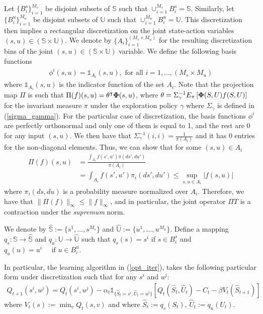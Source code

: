 \documentclass[11pt]{article}
\begin{document}
Let $\{B^s_i\}_{i=1}^{M_s}$ be disjoint subsets of $\mathds{S}$ such that $\cup_{i=1}^{M_s}B^s_i=\mathds{S}$. Similarly, let $\{B^u_i\}_{i=1}^{M_u}$ be disjoint subsets of $\mathds{U}$ such that $\cup_{i=1}^{M_u}B^u_i=\mathds{U}$.   This discretization then implies a rectangular discretization on the joint state-action variables $(s,u)\in(\mathds{S\times U})$.
We denote by $\{A_i\}_{i=1}^{(M_s\times M_u)}$ for the resulting discretization bins of the joint $(s,u)\in(\mathds{S\times U})$ variable.
We define the following basis functions 
\begin{align*}
\phi^i(s,u)=\mathds{1}_{A_i}(s,u), \text{ for all } i=1,\dots, (M_s\times M_u)
\end{align*}
where $\mathds{1}_{A_i}(s,u)$ is the indicator function of the set $A_i$. Note that the projection map $\Pi$ is such that $\Pi(f)(s,u)=\theta^\intercal {\bf \Phi}(s,u)$, where $\theta=\Sigma^{-1}_\gamma E_{\pi}\left[ {\bf \Phi}(S,U)f(S,U)\right]$
for the invariant measure $\pi$ under the exploration policy $\gamma$ where $\Sigma_\gamma$ is defined in (\ref{sigma_gamma}). For the particular case of discretization, the basis functions $\phi^i$ are perfectly orthonormal and only one of them is equal to 1, and the rest are 0 for any input $(s,u)$. We then have that $
\Sigma^{-1}_\gamma(i,i)=\frac{1}{\pi(A_i)}
$
and it has $0$ entries for the non-diagonal elements. Thus, we can show that for some $(s,u)\in A_i$ 
\begin{align*}
\Pi(f)(s,u) &= \frac{\int_{A_i} f(s',u')\pi(ds',du')}{\pi(A_i)}\\
&=\int_{A_i} f(s',u')\pi_i(ds',du')\leq \sup_{s,u\in A_i} |f(s,u)|
\end{align*}
where $\pi_i(ds,du)$ is a probability measure normalized over $A_i$. Therefore, we have that $\|\Pi(f)\|_\infty\leq \|f\|_\infty$, and in particular,  the joint operator $\Pi T$ is a contraction under the \emph{supremum} norm. 


 We denote by $\hat{\mathds{S}}:=\{s^1,\dots,s^{M_s}\}$ and $\hat{\mathds{U}}:=\{u^1,\dots,u^{M_u}\}$.
 Define a mapping $q_s:\mathds{S}\to\mathds{\hat{S}}$ and  $q_u:\mathds{U}\to\mathds{\hat{U}}$  such that 
$q_s(s)=s^i$  if  $s\in B^s_i$ and $q_u(u)=u^i \quad \text{ if } u\in B^u_i.$  %

 In particular, the learning algorithm in (\ref{opt_iter}), takes the following particular form under discretization such that for any $s^i $ and $u^j$:
\begin{align*}
Q_{t+1}(s^i,u^j) = Q_t(s^i,u^j) - \alpha_t \mathds{1}_{\{\hat{S}_t=s^i, \hat{U}_t = u^j\}}\left[ Q_t(\hat{S}_t,\hat{U}_t) - C_t - \beta V_t(\hat{S}_{t+1}) \right]
\end{align*}
where $V_t(s):=\min_v Q_t(s,v)$ and where $\hat{S}_t:=q_s(S_t)$, $\hat{U}_t:=q_u(U_t)$.
\end{document}
